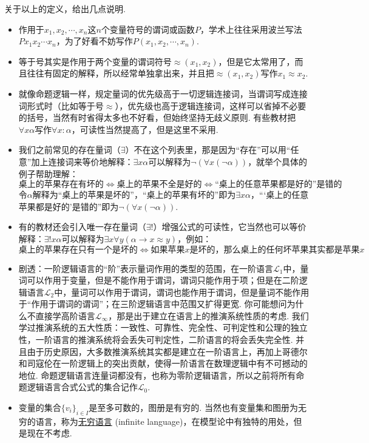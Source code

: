 \documentclass[main.tex]{subfiles}
\begin{document}
关于以上的定义，给出几点说明.
\begin{itemize}
    \item 作用于\(x_1, x_2, \cdots, x_n\)这\(n\)个变量符号的谓词或函数\(P\)，学术上往往采用波兰写法\(Px_1x_2\cdots x_n\)，为了好看不妨写作\(P(x_1,x_2,\cdots,x_n)\).
    \item 等于号其实是作用于两个变量的谓词符号\(\approx(x_1,x_2)\)，但是它太常用了，而且往往有固定的解释，所以经常单独拿出来，并且把\(\approx(x_1,x_2)\)写作\(x_1 \approx x_2\). 
    \item 就像命题逻辑一样，规定量词的优先级高于一切逻辑连接词，当谓词写成连接词形式时（比如等于号\(\approx\)），优先级也高于逻辑连接词，这样可以省掉不必要的括号，当然有时省得太多也不好看，但始终坚持无歧义原则. 有些教材把\(\forall x \alpha\)写作\(\forall x: \alpha\)，可读性当然提高了，但是这里不采用.
    \item 我们之前常见的存在量词（\(\exists\)）不在这个列表里，那是因为“存在”可以用“任意”加上连接词来等价地解释：\(\exists x \alpha\)可以解释为\(\neg(\forall x (\neg\alpha))\)，就举个具体的例子帮助理解：
    \[\mbox{桌上的苹果存在有坏的} \Leftrightarrow \mbox{桌上的苹果不全是好的} \Leftrightarrow \mbox{“桌上的任意苹果都是好的”是错的}\]
    令\(\alpha\)解释为“桌上的苹果是坏的”，“桌上的苹果有坏的”即为\(\exists x \alpha\)，“‘桌上的任意苹果都是好的’是错的”即为\(\neg(\forall x (\neg\alpha))\).
    \item 有的教材还会引入唯一存在量词（\(\exists!\)）增强公式的可读性，它当然也可以等价解释：\(\exists! x \alpha\)可以解释为\(\exists x \forall y(\alpha \to x \approx y)\)，例如：
    \[\mbox{桌上的苹果存在只有一个是坏的} \Leftrightarrow \mbox{如果苹果}x\mbox{是坏的，那么桌上的任何坏苹果其实都是苹果}x \]
    \item 剧透：一阶逻辑语言的“阶”表示量词作用的类型的范围，在一阶语言\(\mathcal{L}_1\)中，量词可以作用于变量，但是不能作用于谓词，谓词只能作用于项；但是在二阶逻辑语言\(\mathcal{L}_2\)中，量词可以作用于谓词，谓词也能作用于谓词，但是量词不能作用于“作用于谓词的谓词”；在三阶逻辑语言中范围又扩得更宽. 你可能想问为什么不直接学高阶语言\(\mathcal{L}_\infty\)，那是出于建立在语言上的推演系统性质的考虑. 我们学过推演系统的五大性质：一致性、可靠性、完全性、可判定性和公理的独立性，一阶语言的推演系统将会丢失可判定性，二阶语言的将会丢失完全性. 并且由于历史原因，大多数推演系统其实都是建立在一阶语言上，再加上哥德尔和司寇伦在一阶逻辑上的突出贡献，使得一阶语言在数理逻辑中有不可撼动的地位. 命题逻辑语言连量词都没有，也称为零阶逻辑语言，所以之前将所有命题逻辑语言合式公式的集合记作\(\mathcal{L}_0\).
    \item 变量的集合\(\{v_i\}_{i \in I}\)是至多可数的，图册是有穷的. 当然也有变量集和图册为无穷的语言，称为\uline{无穷语言} (infinite language)，在模型论中有独特的用处，但是现在不考虑.

\end{itemize}
\end{document}

